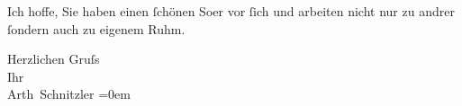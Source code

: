 \pstart
           Ich hoffe, Sie haben einen ſchönen So{\geminationm}er vor ſich und arbeiten nicht nur zu andrer ſondern
               auch zu eigenem Ruhm.\pend
           
\pstart
           Herzlichen Gruſs{\\[\baselineskip]}Ihr{\\[\baselineskip]}\spacefill\mbox{Arth Schnitzler}\pend
           \leftskip=0em{}\endnumbering{}  
      